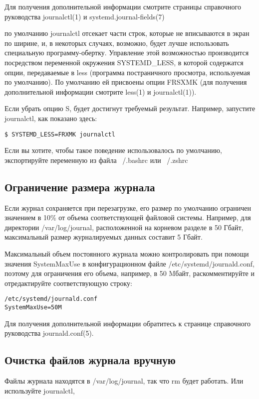 \documentclass[a4paper,10pt,twoside]{article}
\begin{document}
Для получения дополнительной информации смотрите страницы справочного руководства journalctl(1) и systemd.journal-fields(7) 

 по умолчанию journalctl отсекает части строк, которые не вписываются в экран по ширине, и, в некоторых случаях, возможно, будет лучше использовать специальную программу-обертку. Управление этой возможностью производится посредством переменной окружения SYSTEMD\_LESS, в которой содержатся опции, передаваемые в less (программа постраничного просмотра, используемая по умолчанию). По умолчанию ей присвоены опции FRSXMK (для получения дополнительной информации смотрите less(1) и journalctl(1)).

Если убрать опцию S, будет достигнут требуемый результат. Например, запустите journalctl, как показано здесь:

\begin{verbatim}
$ SYSTEMD_LESS=FRXMK journalctl
\end{verbatim} 
Если вы хотите, чтобы такое поведение использовалось по умолчанию, экспортируйте переменную из файла ~/.bashrc или ~/.zshrc

\subsection{Ограничение размера журнала}
Если журнал сохраняется при перезагрузке, его размер по умолчанию ограничен значением в 10\% от объема соответствующей файловой системы. Например, для директории /var/log/journal, расположенной на корневом разделе в 50 Гбайт, максимальный размер журналируемых данных составит 5 Гбайт.

Максимальный объем постоянного журнала можно контролировать при помощи значения SystemMaxUse в конфигурационном файле /etc/systemd/journald.conf, поэтому для ограничения его объема, например, в 50 Mбайт, раскомментируйте и отредактируйте соответствующую строку:
\begin{verbatim}
/etc/systemd/journald.conf
SystemMaxUse=50M
\end{verbatim} 

Для получения дополнительной информации обратитесь к странице справочного руководства journald.conf(5).

\subsection{Очистка файлов журнала вручную}
Файлы журнала находятся в /var/log/journal, так что rm будет работать. Или используйте journalctl,
\end{document}
